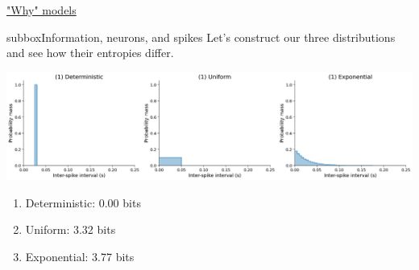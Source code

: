 \begin{textbox}{\href{https://compneuro.neuromatch.io/tutorials/W1D1_ModelTypes/student/W1D1_Tutorial3.html}{"Why" models } }
\begin{subbox}{subbox}{Information, neurons, and spikes}
Let's construct our three distributions and see how their entropies differ.

\begin{center}
    
\includegraphics[scale=0.14]{Figures/MT/MT_Figure8.png}
\end{center}


\begin{enumerate}
\item Deterministic: 0.00 bits
\item Uniform: 3.32 bits
\item Exponential: 3.77 bits
\end{enumerate}
\end{subbox}

\end{textbox}

